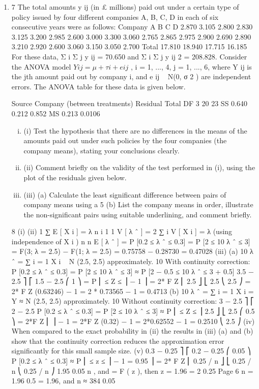 \documentclass[a4paper,12pt]{article}
\begin{document}
\begin{enumerate}
\item
7
The total amounts y ij (in £ millions) paid out under a certain type of policy issued by four different companies A, B, C, D in each of six consecutive years were as follows:
Company
A
B
C
D
2.870
3.105
2.800
2.830
3.125
3.200
2.985
2.600
3.000
3.300
3.060
2.765
2.865
2.975
2.900
2.690
2.890
3.210
2.920
2.600
3.060
3.150
3.050
2.700
Total
17.810
18.940
17.715
16.185
For these data, Σ i Σ j y ij = 70.650 and Σ i Σ j y ij 2 = 208.828.
Consider the ANOVA model $Y ij = μ + τ i + e ij$ , i = 1, ..., 4, j = 1, ..., 6, where Y ij is the
jth amount paid out by company i, and e ij ~ N(0, σ 2 ) are independent errors.
The ANOVA table for these data is given below.

Source
Company (between treatments)
Residual
Total
DF
3
20
23
SS
0.640
0.212
0.852
MS
0.213
0.0106

\begin{enumerate}[(i)]
\item (i) Test the hypothesis that there are no differences in the means of the amounts paid out under such policies by the four companies (the company means), stating your conclusions clearly.
\item 
(ii) Comment briefly on the validity of the test performed in (i), using the plot of the residuals given below.
\item
(iii) (a)
Calculate the least significant difference between pairs of company means using a 5%
(b)
List the company means in order, illustrate the non-significant pairs using suitable underlining, and comment briefly.
\end{enumerate}


8
(i)
(ii)
1
∑ E [ X i ] = λ
n i
1
1
V [ λ ˆ ] = 2 ∑ i V [ X i ] = λ (using independence of X i )
n
n
E [ λ ˆ ] =
P [0.2 ≤ λ ˆ ≤ 0.3] = P [2 ≤ 10 λ ˆ ≤ 3]
= F(3; λ = 2.5) − F(1; λ = 2.5) = 0.75758 − 0.28730 = 0.47028
(iii)
(a)
10 λ ˆ = ∑ i = 1 X i ~ N (2.5, 2.5) approximately.
10
With continuity correction:
P [0.2 ≤ λ ˆ ≤ 0.3] = P [2 ≤ 10 λ ˆ ≤ 3] ≈ P [2 − 0.5 ≤ 10 λ ˆ ≤ 3 + 0.5]
3.5 − 2.5 ⎤
⎡ 1.5 − 2.5
⎛ 1 ⎞
= P ⎢
≤ Z ≤
⎟ − 1
⎥ = 2* F Z ⎜
2.5 ⎦
⎣ 2.5
⎝ 2.5 ⎠
= 2* F Z (0.63246) − 1 = 2 * 0.73565 − 1 = 0.4713
(b)
10 λ ˆ = ∑ i = 1 X i = Y ≈ N (2.5, 2.5) approximately.
10
Without continuity correction:
3 − 2.5 ⎤
⎡ 2 − 2.5
P [0.2 ≤ λ ˆ ≤ 0.3] = P [2 ≤ 10 λ ˆ ≤ 3] ≈ P ⎢
≤ Z ≤
⎥
2.5 ⎦
⎣ 2.5
⎛ 0.5 ⎞
= 2*F Z ⎜
⎟ − 1 = 2*F Z (0.32) − 1 = 2*0.62552 − 1 = 0.2510
⎝ 2.5 ⎠
(iv)
When compared to the exact probability in (ii) the results in (iii) (a) and (b) show that the continuity correction reduces the approximation error significantly for this small sample size.
(v)
0.3 − 0.25 ⎤
⎡ 0.2 − 0.25
⎛ 0.05 ⎞
P [0.2 ≤ λ ˆ ≤ 0.3] ≈ P ⎢
≤ z ≤
⎟ − 1 = 0.95
⎥ = 2* F Z ⎜
0.25 / n ⎦
⎣ 0.25 / n
⎝ 0.25 / n ⎠
1.95
0.05
n , and
= F ( z ), then z = 1.96 =
2
0.25
Page 6
n = 1.96
0.5
= 1.96, and n ≈ 384
0.05


\end{enumerate}
\end{document}
